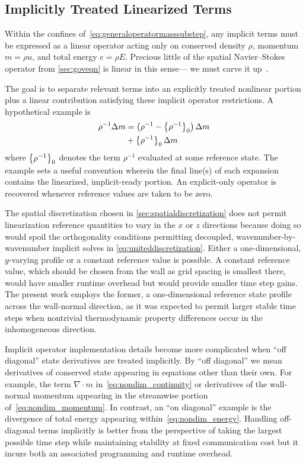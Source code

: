 \clearpage

\subsection{Implicitly Treated Linearized Terms}
\label{sec:implicitlytreatedterms}

Within the confines of~\eqref{eq:generaloperatormasssubstep}, any implicit terms
must be expressed as a linear operator acting only on conserved density $\rho$,
momentum $m=\rho{}u$, and total energy $e=\rho{}E$.  Precious little of the
spatial Navier--Stokes operator from \autoref{sec:goveqn} is linear in
this sense---  we must carve it up~\citep{Buell1990Direct}.

The goal is to separate relevant terms into an explicitly treated nonlinear
portion plus a linear contribution satisfying these implicit operator
restrictions.  A hypothetical example is
\begin{align}
\rho^{-1}\Delta{}m &= \left({\rho^{-1}}-\left\{\rho^{-1}\right\}_{0}\right)\Delta{}m
\notag\\
                   &+ \left\{\rho^{-1}\right\}_{0}\Delta{}m
\label{eq:linearization_example}
\end{align}
where $\left\{\rho^{-1}\right\}_{0}$ denotes the term $\rho^{-1}$ evaluated at some
reference state.  The example sets a useful convention wherein the final line(s)
of each expansion contains the linearized, implicit-ready portion.  An
explicit-only operator is recovered whenever reference values are taken to be
zero.

The spatial discretization chosen in \autoref{sec:spatialdiscretization}
does not permit linearization reference quantities to vary in the $x$ or $z$
directions because doing so would spoil the orthogonality conditions permitting
decoupled, wavenumber-by-wavenumber implicit solves
in \eqref{eq:uniteddiscretization}.
Either a one-dimensional, $y$-varying
profile or a constant reference value is possible.  A constant reference value,
which should be chosen from the wall as grid spacing is smallest there, would
have smaller runtime overhead but would provide smaller time step gains.  The
present work employs the former, a one-dimensional reference state profile
across the wall-normal direction, as it was expected to permit larger stable
time steps when nontrivial thermodynamic property differences occur in the
inhomogeneous direction.

Implicit operator implementation details become more complicated when ``off
diagonal'' state derivatives are treated implicitly.  By ``off diagonal'' we
mean derivatives of conserved state appearing in equations other than their
own.  For example, the term $\nabla\cdot{}m$ in~\eqref{eq:nondim_continuity}
or derivatives of the wall-normal momentum appearing in the streamwise portion
of~\eqref{eq:nondim_momentum}.  In contrast, an ``on diagonal'' example is the
divergence of total energy appearing within~\eqref{eq:nondim_energy}.
Handling off-diagonal terms implicitly is better from the perspective of
taking the largest possible time step while maintaining stability at fixed
communication cost but it incurs both an associated programming and runtime
overhead.

